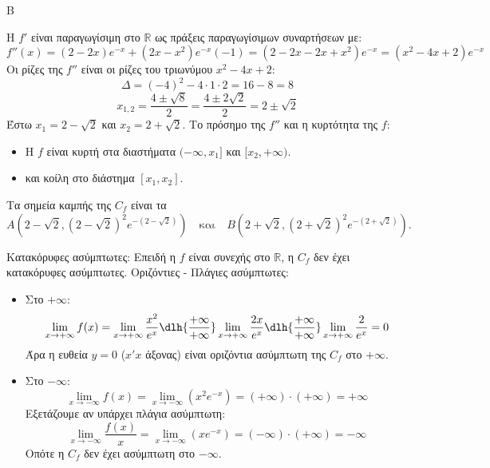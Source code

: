 \begin{thema}{Β}
\begin{erwthma}
\item Η $f'$ είναι παραγωγίσιμη στο $\mathbb{R}$ ως πράξεις παραγωγίσιμων συναρτήσεων με:
\[ f''(x) = (2-2x)e^{-x} + (2x-x^2)e^{-x}(-1) = (2-2x-2x+x^2)e^{-x} = (x^2-4x+2)e^{-x} \]
Οι ρίζες της $f''$ είναι οι ρίζες του τριωνύμου $x^2-4x+2$:
\[ \Delta = (-4)^2 - 4 \cdot 1 \cdot 2 = 16 - 8 = 8 \]
\[ x_{1,2} = \frac{4 \pm \sqrt{8}}{2} = \frac{4 \pm 2\sqrt{2}}{2} = 2 \pm \sqrt{2} \]
Έστω $x_1 = 2-\sqrt{2}$ και $x_2 = 2+\sqrt{2}$. Το πρόσημο της $f''$ και η κυρτότητα της $f$:
\begin{center}
\end{center}
\begin{itemize}
    \item Η $f$ είναι κυρτή στα διαστήματα $(-\infty, x_1]$ και $[x_2, +\infty)$.
    \item και κοίλη στο διάστημα $[x_1, x_2]$.
\end{itemize}
Τα σημεία καμπής της $C_f$ είναι τα
\[
A\left(2-\sqrt{2},(2-\sqrt{2})^2e^{-(2-\sqrt{2})}\right)
\quad \text{και}\quad
B\left(2+\sqrt{2},(2+\sqrt{2})^2e^{-(2+\sqrt{2})}\right).
\]

\item Κατακόρυφες ασύμπτωτες: Επειδή η $f$ είναι συνεχής στο $\mathbb{R}$, η $C_f$ δεν έχει κατακόρυφες ασύμπτωτες.
Οριζόντιες - Πλάγιες ασύμπτωτες:
\begin{itemize}
    \item Στο $+\infty$:
    \[ \lim_{x \to +\infty} f(x) = \lim_{x \to +\infty} \frac{x^2}{e^x} \dlh{\frac{+\infty}{+\infty}} \lim_{x \to +\infty} \frac{2x}{e^x} \dlh{\frac{+\infty}{+\infty}} \lim_{x \to +\infty} \frac{2}{e^x} = 0 \]
    Άρα η ευθεία $y=0$ ($x'x$ άξονας) είναι οριζόντια ασύμπτωτη της $C_f$ στο $+\infty$.
    \item Στο $-\infty$:
    \[ \lim_{x \to -\infty} f(x) = \lim_{x \to -\infty} (x^2 e^{-x}) = (+\infty) \cdot (+\infty) = +\infty \]
    Εξετάζουμε αν υπάρχει πλάγια ασύμπτωτη:
    \[ \lim_{x \to -\infty} \frac{f(x)}{x} = \lim_{x \to -\infty} (x e^{-x}) = (-\infty) \cdot (+\infty) = -\infty \]
    Οπότε η $C_f$ δεν έχει ασύμπτωτη στο $-\infty$.
\end{itemize}


\end{erwthma}
\end{thema}
